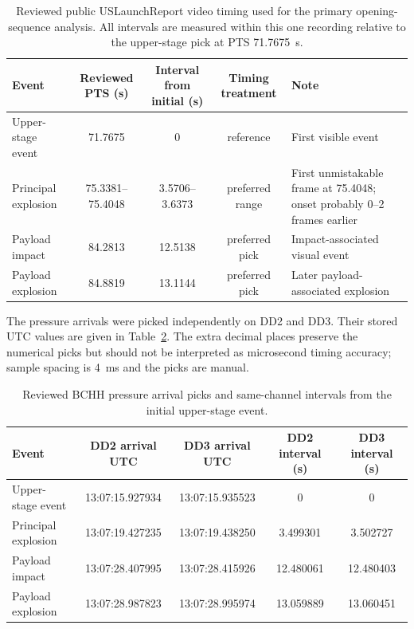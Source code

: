 \documentclass[]{seismica}
\begin{document}
\begin{table}[!tbp]
\centering
\caption{Reviewed public USLaunchReport video timing used for the primary
opening-sequence analysis. All intervals are measured within this one recording
relative to the upper-stage pick at PTS 71.7675~s.}
\label{tab:supp_public_video_pts}
\begin{tabularx}{\textwidth}{XcccX}
\hline
Event & Reviewed PTS (s) & Interval from initial (s) & Timing treatment & Note \\
\hline
Upper-stage event & 71.7675 & 0 & reference & First visible event \\
Principal explosion & 75.3381--75.4048 & 3.5706--3.6373 & preferred range & First unmistakable frame at 75.4048; onset probably 0--2 frames earlier \\
Payload impact & 84.2813 & 12.5138 & preferred pick & Impact-associated visual event \\
Payload explosion & 84.8819 & 13.1144 & preferred pick & Later payload-associated explosion \\
\hline
\end{tabularx}
\end{table}

The pressure arrivals were picked independently on DD2 and DD3. Their stored
UTC values are given in Table~\ref{tab:supp_receiver_picks}. The extra decimal
places preserve the numerical picks but should not be interpreted as
microsecond timing accuracy; sample spacing is 4~ms and the picks are manual.

\begin{table}[!tbp]
\centering
\caption{Reviewed BCHH pressure arrival picks and same-channel intervals from
the initial upper-stage event.}
\label{tab:supp_receiver_picks}
\begin{tabularx}{\textwidth}{Xcccc}
\hline
Event & DD2 arrival UTC & DD3 arrival UTC & DD2 interval (s) & DD3 interval (s) \\
\hline
Upper-stage event & 13:07:15.927934 & 13:07:15.935523 & 0 & 0 \\
Principal explosion & 13:07:19.427235 & 13:07:19.438250 & 3.499301 & 3.502727 \\
Payload impact & 13:07:28.407995 & 13:07:28.415926 & 12.480061 & 12.480403 \\
Payload explosion & 13:07:28.987823 & 13:07:28.995974 & 13.059889 & 13.060451 \\
\hline
\end{tabularx}
\end{table}
\end{document}
